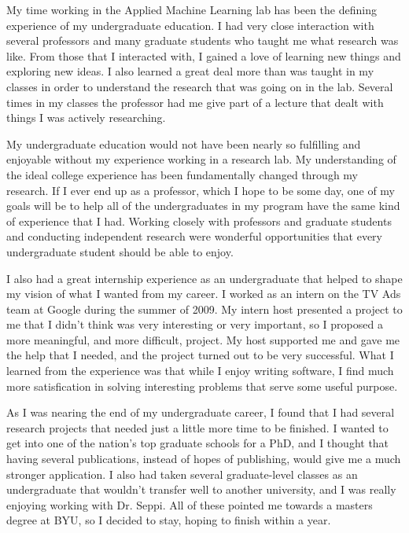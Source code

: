 \documentclass[onecolumn, 12pt]{article}
\begin{document}
My time working in the Applied Machine Learning lab has been the defining
experience of my undergraduate education.  I had very close interaction with
several professors and many graduate students who taught me what research was
like.  From those that I interacted with, I gained a love of learning new
things and exploring new ideas.  I also learned a great deal more than was
taught in my classes in order to understand the research that was going on in
the lab.  Several times in my classes the professor had me give part of a
lecture that dealt with things I was actively researching.  

My undergraduate education would not have been nearly so fulfilling and
enjoyable without my experience working in a research lab.  My understanding of
the ideal college experience has been fundamentally changed through my
research.  If I ever end up as a professor, which I hope to be some day, one of
my goals will be to help all of the undergraduates in my program have the same
kind of experience that I had.  Working closely with professors and graduate
students and conducting independent research were wonderful opportunities that
every undergraduate student should be able to enjoy.

I also had a great internship experience as an undergraduate that helped to
shape my vision of what I wanted from my career.  I worked as an intern on the
TV Ads team at Google during the summer of 2009.  My intern host presented a
project to me that I didn't think was very interesting or very important, so I
proposed a more meaningful, and more difficult, project.  My host supported me
and gave me the help that I needed, and the project turned out to be very
successful.  What I learned from the experience was that while I enjoy writing
software, I find much more satisfication in solving interesting problems that
serve some useful purpose.

As I was nearing the end of my undergraduate career, I found that I had several
research projects that needed just a little more time to be finished.  I wanted
to get into one of the nation's top graduate schools for a PhD, and I thought
that having several publications, instead of hopes of publishing, would give me
a much stronger application.  I also had taken several graduate-level classes
as an undergraduate that wouldn't transfer well to another university, and I
was really enjoying working with Dr. Seppi.  All of these pointed me towards a
masters degree at BYU, so I decided to stay, hoping to finish within a year.
\end{document}
